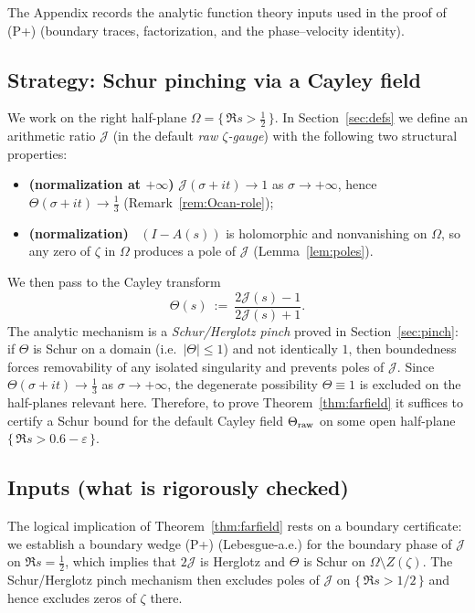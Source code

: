 \documentclass[11pt]{amsart}
\theoremstyle{definition}
\theoremstyle{remark}
\DeclareMathOperator{\dettwo}{det_2}
\begin{document}
The Appendix records the analytic function theory inputs used in the proof of \textup{(P+)} (boundary traces, factorization, and the phase--velocity identity).

\subsection*{Strategy: Schur pinching via a Cayley field}
We work on the right half-plane $\Omega=\{\,\Re s>\tfrac12\,\}$.
In Section~\ref{sec:defs} we define an arithmetic ratio $\mathcal J$ (in the default \emph{raw $\zeta$-gauge}) with the following two structural properties:
\begin{itemize}
\item \textbf{(normalization at $+\infty$)} $\mathcal J(\sigma+it)\to 1$ as $\sigma\to+\infty$, hence $\Theta(\sigma+it)\to \tfrac13$ (Remark~\ref{rem:Ocan-role});
\item \textbf{(normalization)} $\dettwo(I-A(s))$ is holomorphic and nonvanishing on $\Omega$, so any zero of $\zeta$ in $\Omega$ produces a pole of $\mathcal J$ (Lemma~\ref{lem:poles}).
\end{itemize}
We then pass to the Cayley transform
\[
  \Theta(s)\ :=\ \frac{2\mathcal J(s)-1}{2\mathcal J(s)+1}.
\]
The analytic mechanism is a \emph{Schur/Herglotz pinch} proved in Section~\ref{sec:pinch}:
if $\Theta$ is Schur on a domain (i.e.\ $|\Theta|\le 1$) and not identically $1$, then boundedness forces removability of any isolated singularity and prevents poles of $\mathcal J$.
Since $\Theta(\sigma+it)\to \tfrac13$ as $\sigma\to+\infty$, the degenerate possibility $\Theta\equiv 1$ is excluded on the half-planes relevant here.
Therefore, to prove Theorem~\ref{thm:farfield} it suffices to certify a Schur bound for the default Cayley field $\Theta_{\rm raw}$ on some open half-plane $\{\,\Re s>0.6-\varepsilon\,\}$.

\subsection*{Inputs (what is rigorously checked)}
The logical implication of Theorem~\ref{thm:farfield} rests on a boundary certificate:
we establish a boundary wedge \textup{(P+)} (Lebesgue-a.e.) for the boundary phase of $\mathcal J$ on $\Re s=\tfrac12$, which implies that $2\mathcal J$ is Herglotz and $\Theta$ is Schur on $\Omega\setminus Z(\zeta)$.
The Schur/Herglotz pinch mechanism then excludes poles of $\mathcal J$ on $\{\,\Re s>1/2\,\}$ and hence excludes zeros of $\zeta$ there.
\end{document}
